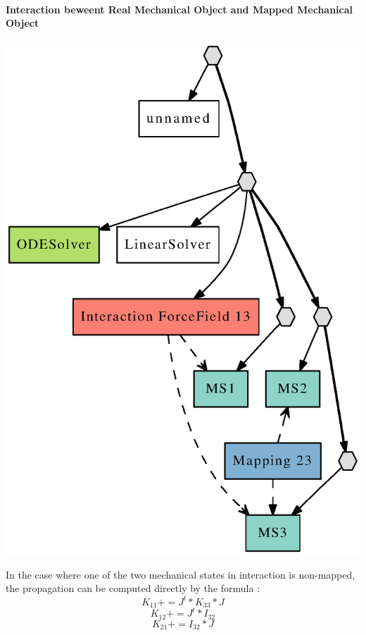 \documentclass[a4paper,10pt]{article}
\begin{document}
\paragraph{Interaction beweent Real Mechanical Object and Mapped Mechanical Object}
\begin{center}
  \includegraphics[scale=0.3]{interaction_Real_Mapped}
\end{center}
In the case where one of the two mechanical states in interaction is non-mapped, the propagation can be computed directly by the formula :
\[
K_{11} += J^t * K_{33} * J 
\]
\[
K_{12} += J^t * I_{32}
\]
\[
K_{21} += I_{32} * J 
\]
\end{document}
